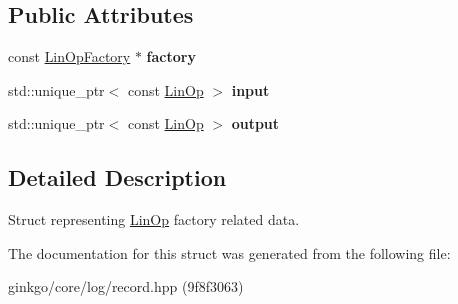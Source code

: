 \subsection*{Public Attributes}
\begin{DoxyCompactItemize}
\item 
\mbox{\label{structgko_1_1log_1_1linop__factory__data_abd892acbefd3c147e384a3dcc897f6ac}} 
const \hyperlink{classgko_1_1LinOpFactory}{Lin\+Op\+Factory} $\ast$ {\bfseries factory}
\item 
\mbox{\label{structgko_1_1log_1_1linop__factory__data_a6ea6595461c7157fa729c91239147f14}} 
std\+::unique\+\_\+ptr$<$ const \hyperlink{classgko_1_1LinOp}{Lin\+Op} $>$ {\bfseries input}
\item 
\mbox{\label{structgko_1_1log_1_1linop__factory__data_a5056dcdd50e3f842c2069959ca85b1c3}} 
std\+::unique\+\_\+ptr$<$ const \hyperlink{classgko_1_1LinOp}{Lin\+Op} $>$ {\bfseries output}
\end{DoxyCompactItemize}


\subsection{Detailed Description}
Struct representing \hyperlink{classgko_1_1LinOp}{Lin\+Op} factory related data. 

The documentation for this struct was generated from the following file\+:\begin{DoxyCompactItemize}
\item 
ginkgo/core/log/record.\+hpp (9f8f3063)\end{DoxyCompactItemize}
